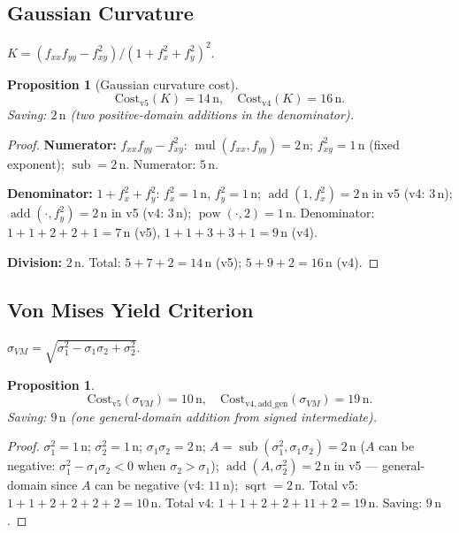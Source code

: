 \documentclass[12pt,a4paper]{article}
\newtheorem{proposition}[theorem]{Proposition}
\theoremstyle{definition}
\newcommand{\mulop}{\operatorname{mul}}
\newcommand{\subop}{\operatorname{sub}}
\newcommand{\addop}{\operatorname{add}}
\newcommand{\powop}{\operatorname{pow}}
\newcommand{\sqrtop}{\operatorname{sqrt}}
\newcommand{\Cost}{\mathrm{Cost}}
\begin{document}
\subsection{Gaussian Curvature}

$K = (f_{xx} f_{yy} - f_{xy}^2) / (1 + f_x^2 + f_y^2)^2$.

\begin{proposition}[Gaussian curvature cost]
\[
  \Cost_{\mathrm{v5}}(K) = 14\,\text{n}, \quad
  \Cost_{\mathrm{v4}}(K) = 16\,\text{n}.
\]
Saving: $2\,\text{n}$ (two positive-domain additions in the denominator).
\end{proposition}

\begin{proof}
\textbf{Numerator:} $f_{xx} f_{yy} - f_{xy}^2$:
$\mulop(f_{xx}, f_{yy}) = 2\,\text{n}$;
$f_{xy}^2 = 1\,\text{n}$ (fixed exponent);
$\subop = 2\,\text{n}$.  Numerator: $5\,\text{n}$.

\textbf{Denominator:} $1 + f_x^2 + f_y^2$:
$f_x^2 = 1\,\text{n}$, $f_y^2 = 1\,\text{n}$;
$\addop(1, f_x^2) = 2\,\text{n}$ in v5 (v4: $3\,\text{n}$);
$\addop(\cdot, f_y^2) = 2\,\text{n}$ in v5 (v4: $3\,\text{n}$);
$\powop(\cdot, 2) = 1\,\text{n}$.  Denominator: $1+1+2+2+1 = 7\,\text{n}$ (v5),
$1+1+3+3+1 = 9\,\text{n}$ (v4).

\textbf{Division:} $2\,\text{n}$.  Total: $5 + 7 + 2 = 14\,\text{n}$ (v5);
$5 + 9 + 2 = 16\,\text{n}$ (v4).
\end{proof}

\subsection{Von Mises Yield Criterion}

$\sigma_{VM} = \sqrt{\sigma_1^2 - \sigma_1 \sigma_2 + \sigma_2^2}$.

\begin{proposition}
\[
  \Cost_{\mathrm{v5}}(\sigma_{VM}) = 10\,\text{n}, \quad
  \Cost_{\mathrm{v4, add\_gen}}(\sigma_{VM}) = 19\,\text{n}.
\]
Saving: $9\,\text{n}$ (one general-domain addition from signed intermediate).
\end{proposition}

\begin{proof}
$\sigma_1^2 = 1\,\text{n}$; $\sigma_2^2 = 1\,\text{n}$;
$\sigma_1 \sigma_2 = 2\,\text{n}$;
$A = \subop(\sigma_1^2, \sigma_1\sigma_2) = 2\,\text{n}$
($A$ can be negative: $\sigma_1^2 - \sigma_1\sigma_2 < 0$ when $\sigma_2 > \sigma_1$);
$\addop(A, \sigma_2^2) = 2\,\text{n}$ in v5 — general-domain since $A$ can be
negative (v4: $11\,\text{n}$);
$\sqrtop = 2\,\text{n}$.
Total v5: $1+1+2+2+2+2 = 10\,\text{n}$.
Total v4: $1+1+2+2+11+2 = 19\,\text{n}$.  Saving: $9\,\text{n}$.
\end{proof}
\end{document}
